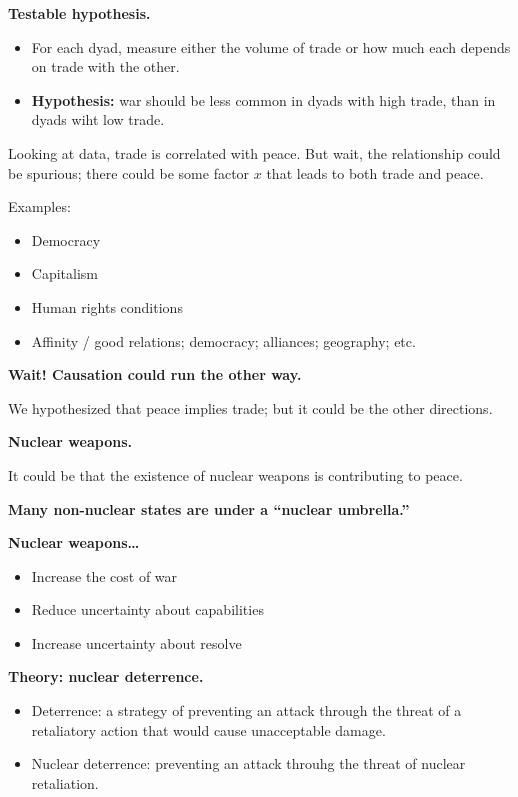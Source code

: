 \documentclass{article}
\begin{document}
{\bf Testable hypothesis.}

\begin{itemize}
  \item For each dyad, measure either the volume of trade or how much each depends on trade with the other.
  \item {\bf Hypothesis:} war should be less common in dyads with high trade, than in dyads wiht low trade.
\end{itemize}

Looking at data, trade is correlated with peace.  But wait, the relationship could be spurious; there could be some factor $x$ that leads to both trade and peace.

Examples:
\begin{itemize}
  \item Democracy
  \item Capitalism
  \item Human rights conditions
  \item Affinity / good relations; democracy; alliances; geography; etc.
\end{itemize}

{\bf Wait! Causation could run the other way.}

We hypothesized that peace implies trade; but it could be the other directions.

{\bf Nuclear weapons.}

It could be that the existence of nuclear weapons is contributing to peace.

{\bf Many non-nuclear states are under a ``nuclear umbrella.''}

{\bf Nuclear weapons\ldots}
\begin{itemize}
  \item Increase the cost of war
  \item Reduce uncertainty about capabilities
  \item Increase uncertainty about resolve
\end{itemize}

{\bf Theory: nuclear deterrence.}

\begin{itemize}
  \item Deterrence: a strategy of preventing an attack through the threat of a retaliatory action that would cause unacceptable damage.
  \item Nuclear deterrence: preventing an attack throuhg the threat of nuclear retaliation.
\end{itemize}
\end{document}
